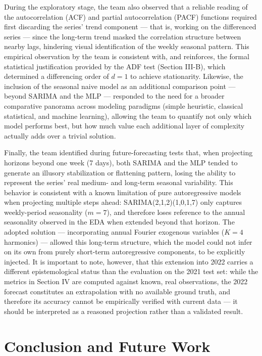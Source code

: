 \documentclass{ieeeaccess}
\begin{document}
During the exploratory stage, the team also observed that a reliable reading of the autocorrelation (ACF) and partial autocorrelation (PACF) functions required first discarding the series' trend component --- that is, working on the differenced series --- since the long-term trend masked the correlation structure between nearby lags, hindering visual identification of the weekly seasonal pattern. This empirical observation by the team is consistent with, and reinforces, the formal statistical justification provided by the ADF test (Section III-B), which determined a differencing order of $d=1$ to achieve stationarity. Likewise, the inclusion of the seasonal naive model as an additional comparison point --- beyond SARIMA and the MLP --- responded to the need for a broader comparative panorama across modeling paradigms (simple heuristic, classical statistical, and machine learning), allowing the team to quantify not only which model performs best, but how much value each additional layer of complexity actually adds over a trivial solution.

Finally, the team identified during future-forecasting tests that, when projecting horizons beyond one week (7 days), both SARIMA and the MLP tended to generate an illusory stabilization or flattening pattern, losing the ability to represent the series' real medium- and long-term seasonal variability. This behavior is consistent with a known limitation of pure autoregressive models when projecting multiple steps ahead: SARIMA(2,1,2)(1,0,1,7) only captures weekly-period seasonality ($m=7$), and therefore loses reference to the annual seasonality observed in the EDA when extended beyond that horizon. The adopted solution --- incorporating annual Fourier exogenous variables ($K=4$ harmonics) --- allowed this long-term structure, which the model could not infer on its own from purely short-term autoregressive components, to be explicitly injected. It is important to note, however, that this extension into 2022 carries a different epistemological status than the evaluation on the 2021 test set: while the metrics in Section IV are computed against known, real observations, the 2022 forecast constitutes an extrapolation with no available ground truth, and therefore its accuracy cannot be empirically verified with current data --- it should be interpreted as a reasoned projection rather than a validated result.

\section{Conclusion and Future Work}
\label{sec:Conclusion and Future Work}
\end{document}
